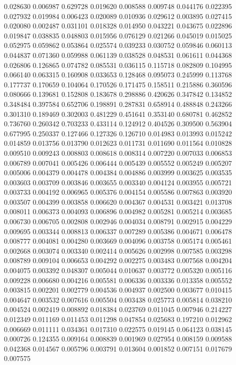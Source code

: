 0.028630
0.006987
0.629728
0.019620
0.008588
0.009748
0.044176
0.022395
0.027932
0.019984
0.006423
0.020089
0.010936
0.029612
0.003895
0.027415
0.020080
0.002487
0.031101
0.018328
0.014950
0.043221
0.043675
0.022896
0.019847
0.038835
0.048803
0.015956
0.076129
0.021266
0.045019
0.015025
0.052975
0.059862
0.053864
0.025574
0.039233
0.030752
0.059846
0.060113
0.044837
0.071360
0.059988
0.061139
0.038528
0.048531
0.061611
0.044368
0.026806
0.126865
0.074782
0.085531
0.036115
0.115718
0.082809
0.104995
0.066140
0.063315
0.160908
0.033653
0.128468
0.095073
0.245999
0.113768
0.177737
0.170659
0.104064
0.170526
0.171475
0.158511
0.215886
0.360596
0.080666
0.139681
0.152808
0.183678
0.298886
0.420626
0.347842
0.134852
0.348484
0.397584
0.652706
0.198891
0.287831
0.658914
0.488848
0.243266
0.301310
0.189469
0.302003
0.481229
0.451641
0.353140
0.680781
0.462852
0.736760
0.260342
0.703233
0.433114
0.124912
0.404526
0.309500
0.563904
0.677995
0.250337
0.127466
0.127326
0.126710
0.014983
0.013993
0.015242
0.014859
0.013756
0.013790
0.012623
0.011731
0.011690
0.011564
0.010828
0.009510
0.009243
0.008803
0.008618
0.008314
0.007220
0.007033
0.006853
0.006789
0.007041
0.005426
0.006444
0.005439
0.005552
0.005249
0.005207
0.005006
0.004379
0.004478
0.004384
0.004886
0.003999
0.003625
0.003535
0.003603
0.003709
0.003846
0.003655
0.003340
0.004124
0.003955
0.005721
0.003733
0.004192
0.006965
0.005376
0.004154
0.005586
0.007863
0.003920
0.003507
0.004399
0.003858
0.006620
0.004367
0.004531
0.003421
0.013708
0.008011
0.006373
0.004093
0.006896
0.004982
0.005281
0.005214
0.003685
0.006730
0.006705
0.002808
0.002946
0.004034
0.008791
0.002915
0.004229
0.009695
0.003344
0.008813
0.006337
0.007289
0.005386
0.004671
0.006478
0.008777
0.004081
0.004280
0.003669
0.004096
0.003758
0.005174
0.005461
0.002668
0.003074
0.003340
0.002414
0.005626
0.002998
0.007585
0.003298
0.008789
0.009104
0.006653
0.004292
0.002275
0.003483
0.007568
0.004204
0.004075
0.003392
0.048307
0.005044
0.010637
0.003772
0.005320
0.005116
0.009228
0.006680
0.004216
0.005581
0.006336
0.003336
0.013358
0.005552
0.003815
0.002201
0.002779
0.004536
0.004937
0.002500
0.003677
0.010415
0.004647
0.003532
0.007616
0.005504
0.003438
0.025773
0.005814
0.038210
0.004524
0.002419
0.008892
0.018384
0.023769
0.011045
0.007946
0.214227
0.012349
0.011169
0.011453
0.011298
0.047854
0.025683
0.197210
0.012962
0.006669
0.011111
0.034361
0.017310
0.022575
0.019145
0.064123
0.038145
0.000726
0.124355
0.009164
0.008839
0.001969
0.027954
0.008159
0.009588
0.042368
0.014567
0.005796
0.003791
0.013604
0.001852
0.007151
0.017679
0.007575
